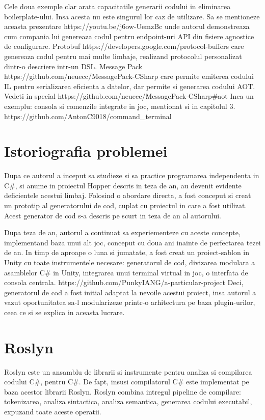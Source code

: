 \documentclass{report}
\begin{document}
Cele doua exemple clar arata capacitatile generarii codului in
eliminarea boilerplate-ului. Insa acesta nu este singurul lor caz de
utilizare. Sa se mentioneze aceasta prezentare
https://youtu.be/j6ow-UemzBc unde autorul demonstreaza cum compania lui
genereaza codul pentru endpoint-uri API din fisiere agnostice de
configurare. Protobuf https://developers.google.com/protocol-buffers
care genereaza codul pentru mai multe limbaje, realizand protocolul
personalizat dintr-o descriere intr-un DSL. Message Pack
https://github.com/neuecc/MessagePack-CSharp care permite emiterea
codului IL pentru serializarea eficienta a datelor, dar permite si
generarea codului AOT. Vedeti in special
https://github.com/neuecc/MessagePack-CSharp\#aot Inca un exemplu:
consola si comenzile integrate in joc, mentionat si in capitolul 3.
https://github.com/AntonC9018/command\_terminal

\section{Istoriografia problemei}

Dupa ce autorul a inceput sa studieze si sa practice programarea
independenta in C\#, si anume in proiectul Hopper descris in teza de an,
au devenit evidente deficientele acestui limbaj. Folosind o abordare
directa, a fost conceput si creat un prototip al generatorului de cod,
cuplat cu proiectul in care a fost utilizat. Acest generator de cod s-a
descris pe scurt in teza de an al autorului.

Dupa teza de an, autorul a continuat sa experiementeze cu aceste
concepte, implementand baza unui alt joc, conceput cu doua ani inainte
de perfectarea tezei de an. In timp de aproape o luna si jumatate, a
fost creat un proiect-sablon in Unity cu toate instrumentele necesare:
generatorul de cod, divizarea modulara a asamblelor C\# in Unity,
integrarea unui terminal virtual in joc, o interfata de consola
centrala. https://github.com/PunkyIANG/a-particular-project Deci,
generatorul de cod a fost initial adaptat la nevoile acestui proiect,
insa autorul a vazut oportunitatea sa-l modularizeze printr-o
arhitectura pe baza plugin-urilor, ceea ce si se explica in aceasta
lucrare.

\section{Roslyn}

Roslyn este un ansamblu de librarii si instrumente pentru analiza si
compilarea codului C\#, pentru C\#. De fapt, insusi compilatorul C\#
este implementat pe baza acestor librarii Roslyn. Roslyn combina
intregul pipeline de compilare: tokenizarea, analiza sintactica, analiza
semantica, generarea codului executabil, expuzand toate aceste operatii.
\end{document}

